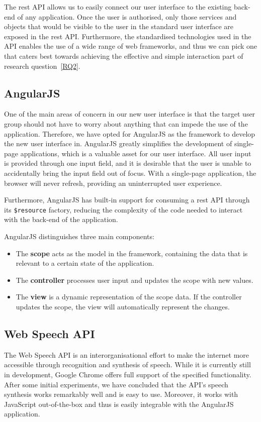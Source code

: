 The \acrshort{rest} API allows us to easily connect our user interface to the existing back-end of any application. Once the user is authorised, only those services and objects that would be visible to the user in the standard user interface are exposed in the \acrshort{rest} API. Furthermore, the standardised technologies used in the API enables the use of a wide range of web frameworks, and thus we can pick one that caters best towards achieving the effective and simple interaction part of research question~\ref{RQ2}.

\subsection{AngularJS}
\label{subsection:angularjs}
One of the main areas of concern in our new user interface is that the target user group should not have to worry about anything that can impede the use of the application. Therefore, we have opted for AngularJS\cite{Angul50:online} as the framework to develop the new user interface in. AngularJS greatly simplifies the development of single-page applications, which is a valuable asset for our user interface. All user input is provided through one input field, and it is desirable that the user is unable to accidentally bring the input field out of focus. With a single-page application, the browser will never refresh, providing an uninterrupted user experience.

Furthermore, AngularJS has built-in support for consuming a \acrshort{rest} API through its \newline \texttt{\$resource} factory, reducing the complexity of the code needed to interact with the back-end of the application.

AngularJS distinguishes three main components:

\begin{itemize}
	\item The \textbf{scope} acts as the model in the framework, containing the data that is relevant to a certain state of the application.
	\item The \textbf{controller} processes user input and updates the scope with new values.
	\item The \textbf{view} is a dynamic representation of the scope data. If the controller updates the scope, the view will automatically represent the changes.
\end{itemize}

\subsection{Web Speech API}
\label{subsection:webspeechapi}
The Web Speech API is an interorganisational effort to make the internet more accessible through recognition and synthesis of speech\cite{WebSp68:online}. While it is currently still in development, Google Chrome offers full support of the specified functionality. After some initial experiments, we have concluded that the API's speech synthesis works remarkably well and is easy to use. Moreover, it works with JavaScript out-of-the-box and thus is easily integrable with the AngularJS application.

